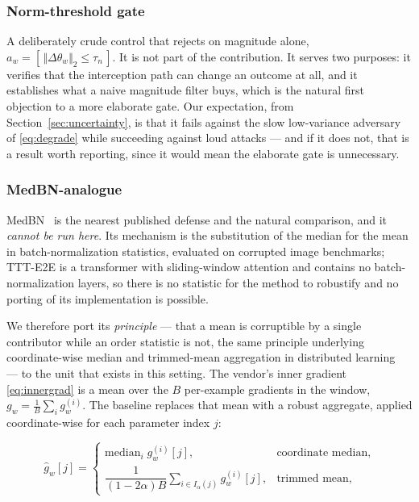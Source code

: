 \documentclass[journal]{IEEEtran}
\newcommand{\dtheta}{\Delta\theta}
\begin{document}
\subsubsection{Norm-threshold gate}
A deliberately crude control that rejects on magnitude alone,
$a_w = [\,\Vert\dtheta_w\Vert_2 \leq \tau_{n}\,]$. It is not part of the
contribution. It serves two purposes: it verifies that the interception path can
change an outcome at all, and it establishes what a naive magnitude filter buys,
which is the natural first objection to a more elaborate gate. Our expectation, from
Section~\ref{sec:uncertainty}, is that it fails against the slow low-variance
adversary of \eqref{eq:degrade} while succeeding against loud attacks --- and if it
does not, that is a result worth reporting, since it would mean the elaborate gate is
unnecessary.

\subsubsection{MedBN-analogue}
MedBN~\cite{park2024medbn} is the nearest published defense and the natural
comparison, and it \emph{cannot be run here}. Its mechanism is the substitution of
the median for the mean in batch-normalization statistics, evaluated on corrupted
image benchmarks; TTT-E2E is a transformer with sliding-window attention and contains
no batch-normalization layers, so there is no statistic for the method to robustify
and no porting of its implementation is possible.

We therefore port its \emph{principle} --- that a mean is corruptible by a single
contributor while an order statistic is not, the same principle underlying
coordinate-wise median and trimmed-mean aggregation in distributed
learning~\cite{yin2018trimmed} --- to the unit that exists in this setting. The
vendor's inner gradient \eqref{eq:innergrad} is a mean over the $B$ per-example
gradients in the window, $g_w = \frac{1}{B}\sum_{i} g_w^{(i)}$. The baseline replaces
that mean with a robust aggregate, applied coordinate-wise for each parameter index
$j$:

\begin{equation}
\hat{g}_w[j] =
\begin{cases}
\mathrm{median}_{i}\; g_w^{(i)}[j], & \text{coordinate median},\\[4pt]
\dfrac{1}{(1-2\alpha)B}\displaystyle\sum_{i \in I_{\alpha}(j)} g_w^{(i)}[j],
 & \text{trimmed mean},
\end{cases}
\label{eq:robustagg}
\end{equation}
\end{document}
